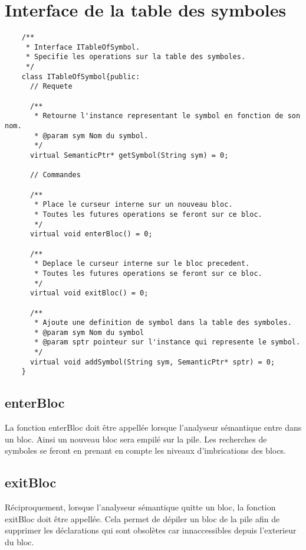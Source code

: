 \documentclass{../../res/univ-projet}
\begin{document}
 \section{Interface de la table des symboles}
    \begin{verbatim}
    /**
     * Interface ITableOfSymbol.
     * Specifie les operations sur la table des symboles.
     */
    class ITableOfSymbol{public:
      // Requete

      /**
       * Retourne l'instance representant le symbol en fonction de son nom.
       * @param sym Nom du symbol.
       */
      virtual SemanticPtr* getSymbol(String sym) = 0;

      // Commandes

      /**
       * Place le curseur interne sur un nouveau bloc.
       * Toutes les futures operations se feront sur ce bloc.
       */
      virtual void enterBloc() = 0;

      /**
       * Deplace le curseur interne sur le bloc precedent.
       * Toutes les futures operations se feront sur ce bloc.
       */
      virtual void exitBloc() = 0;

      /**
       * Ajoute une definition de symbol dans la table des symboles.
       * @param sym Nom du symbol
       * @param sptr pointeur sur l'instance qui represente le symbol.
       */
      virtual void addSymbol(String sym, SemanticPtr* sptr) = 0;
    }
    \end{verbatim}

  \subsection{enterBloc}
    La fonction enterBloc doit être appellée lorsque l'analyseur sémantique entre dans un bloc. Ainsi un nouveau bloc sera empilé sur la pile. Les recherches de symboles se feront en prenant en compte les niveaux d'imbrications des blocs.
  \subsection{exitBloc}
   Réciproquement, lorsque l'analyseur sémantique quitte un bloc, la fonction exitBloc doit être appellée. Cela permet de dépiler un bloc de la pile afin de supprimer les déclarations qui sont obsolètes car innaccessibles depuis l'exterieur du bloc.
\end{document}
